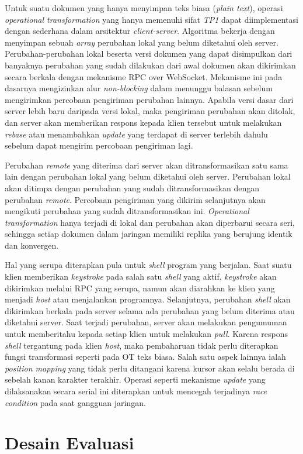 Untuk suatu dokumen yang hanya menyimpan teks biasa (\textit{plain text}), operasi \textit{operational transformation} yang hanya memenuhi sifat \textit{TP1} dapat diimplementasi dengan sederhana dalam arsitektur \textit{client-server}. Algoritma bekerja dengan menyimpan sebuah \textit{array} perubahan lokal yang belum diketahui oleh server. Perubahan-perubahan lokal beserta versi dokumen yang dapat disimpulkan dari banyaknya perubahan yang sudah dilakukan dari awal dokumen akan dikirimkan secara berkala dengan mekanisme RPC over WebSocket. Mekanisme ini pada dasarnya mengizinkan alur \textit{non-blocking} dalam menunggu balasan sebelum mengirimkan percobaan pengiriman perubahan lainnya. Apabila versi dasar dari server lebih baru daripada versi lokal, maka pengiriman perubahan akan ditolak, dan server akan memberikan respons kepada klien tersebut untuk melakukan \textit{rebase} atau menambahkan \textit{update} yang terdapat di server terlebih dahulu sebelum dapat mengirim percobaan pengiriman lagi.

Perubahan \textit{remote} yang diterima dari server akan ditransformasikan satu sama lain dengan perubahan lokal yang belum diketahui oleh server. Perubahan lokal akan ditimpa dengan perubahan yang sudah ditransformasikan dengan perubahan \textit{remote}. Percobaan pengiriman yang dikirim selanjutnya akan mengikuti perubahan yang sudah ditransformasikan ini. \textit{Operational transformation} hanya terjadi di lokal dan perubahan akan diperbarui secara seri, sehingga setiap dokumen dalam jaringan memiliki replika yang berujung identik dan konvergen.

Hal yang serupa diterapkan pula untuk \textit{shell} program yang berjalan. Saat suatu klien memberikan \textit{keystroke} pada salah satu \textit{shell} yang aktif, \textit{keystroke} akan dikirimkan melalui RPC yang serupa, namun akan diarahkan ke klien yang menjadi \textit{host} atau menjalankan programnya. Selanjutnya, perubahan \textit{shell} akan dikirimkan berkala pada server selama ada perubahan yang belum diterima atau diketahui server. Saat terjadi perubahan, server akan melakukan pengumuman untuk memberitahu kepada setiap klien untuk melakukan \textit{pull}. Karena respons \textit{shell} tergantung pada klien \textit{host}, maka pembaharuan tidak perlu diterapkan fungsi transformasi seperti pada OT teks biasa. Salah satu aspek lainnya ialah \textit{position mapping} yang tidak perlu ditangani karena kursor akan selalu berada di sebelah kanan karakter terakhir. Operasi seperti mekanisme \textit{update} yang dilaksanakan secara serial ini diterapkan untuk mencegah terjadinya \textit{race condition} pada saat gangguan jaringan.

\section{Desain Evaluasi}
\label{sec:desain_evaluasi}